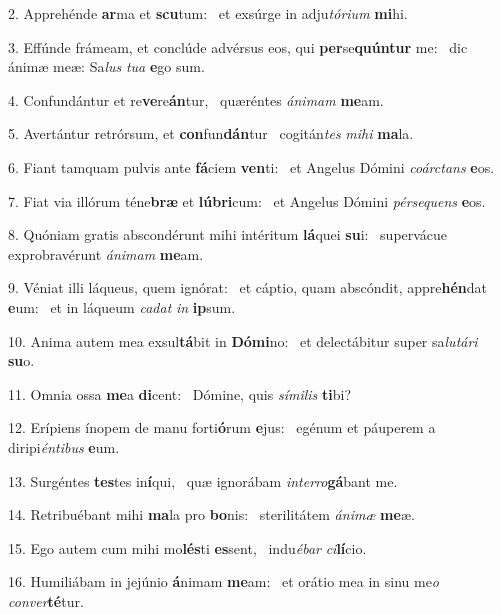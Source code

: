2. Apprehénde \textbf{ar}ma et \textbf{scu}tum: \ast\  et exsúrge in adju\textit{tó}\textit{ri}\textit{um} \textbf{mi}hi.\

3. Effúnde frámeam, et conclúde advérsus eos, qui \textbf{per}se\textbf{quún}\textbf{tur} me: \ast\  dic ánimæ meæ: Sa\textit{lus} \textit{tu}\textit{a} \textbf{e}go sum.\

4. Confundántur et re\textbf{ve}re\textbf{án}tur, \ast\  quæréntes \textit{á}\textit{ni}\textit{mam} \textbf{me}am.\

5. Avertántur retrórsum, et \textbf{con}fun\textbf{dán}tur \ast\  cogitán\textit{tes} \textit{mi}\textit{hi} \textbf{ma}la.\

6. Fiant tamquam pulvis ante \textbf{fá}ciem \textbf{ven}ti: \ast\  et Angelus Dómini \textit{co}\textit{árc}\textit{tans} \textbf{e}os.\

7. Fiat via illórum téne\textbf{bræ} et \textbf{lú}\textbf{bri}cum: \ast\  et Angelus Dómini \textit{pér}\textit{se}\textit{quens} \textbf{e}os.\

8. Quóniam gratis abscondérunt mihi intéritum \textbf{lá}quei \textbf{su}i: \ast\  supervácue exprobravérunt \textit{á}\textit{ni}\textit{mam} \textbf{me}am.\

9. Véniat illi láqueus, quem ignórat: \dag\  et cáptio, quam abscóndit, appre\textbf{hén}dat \textbf{e}um: \ast\  et in láqueum \textit{ca}\textit{dat} \textit{in} \textbf{ip}sum.\

10. Anima autem mea exsul\textbf{tá}bit in \textbf{Dó}\textbf{mi}no: \ast\  et delectábitur super sa\textit{lu}\textit{tá}\textit{ri} \textbf{su}o.\

11. Omnia ossa \textbf{me}a \textbf{di}cent: \ast\  Dómine, quis \textit{sí}\textit{mi}\textit{lis} \textbf{ti}bi?\

12. Erípiens ínopem de manu forti\textbf{ó}rum \textbf{e}jus: \ast\  egénum et páuperem a diripi\textit{én}\textit{ti}\textit{bus} \textbf{e}um.\

13. Surgéntes \textbf{tes}tes in\textbf{í}qui, \ast\  quæ ignorábam \textit{in}\textit{ter}\textit{ro}\textbf{gá}bant me.\

14. Retribuébant mihi \textbf{ma}la pro \textbf{bo}nis: \ast\  sterilitátem \textit{á}\textit{ni}\textit{mæ} \textbf{me}æ.\

15. Ego autem cum mihi mo\textbf{lés}ti \textbf{es}sent, \ast\  indu\textit{é}\textit{bar} \textit{ci}\textbf{lí}cio.\

16. Humiliábam in jejúnio \textbf{á}nimam \textbf{me}am: \ast\  et orátio mea in sinu me\textit{o} \textit{con}\textit{ver}\textbf{té}tur.\

